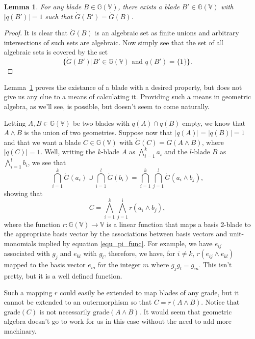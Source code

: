 \documentclass{birkjour}
\newtheorem{lem}[thm]{Lemma}
\theoremstyle{definition}
\theoremstyle{remark}
\numberwithin{equation}{section}
\newcommand{\G}{\mathbb{G}}
\newcommand{\V}{\mathbb{V}}
\newcommand{\Gi}{\dot{G}}
\begin{document}
\begin{lem}\label{lma_geo_reduction}
For any blade $B\in\G(\V)$, there exists a blade $B'\in\G(\V)$ with $|q(B')|=1$ such
that $\Gi(B')=\Gi(B)$.
\end{lem}
\begin{proof}
It is clear that $\Gi(B)$ is an algebraic set as finite unions and arbitrary
intersections of such sets are algebraic.  Now simply see that the set of all
algebraic sets is covered by the set
\begin{equation}
\{\Gi(B')|\mbox{$B'\in\G(\V)$ and $q(B')=\{1\}$}\}.
\end{equation}
\end{proof}
Lemma~\ref{lma_geo_reduction} proves the existance of a blade with a desired
property, but does not give us
any clue to a means of calculating it.  Providing such a means in geometric algebra,
as we'll see, is possible, but doesn't seem to come naturally.

Letting $A,B\in\G(\V)$ be two blades with $q(A)\cap q(B)$ empty,
we know that $A\wedge B$ is the union of two geometries.  Suppose
now that $|q(A)|=|q(B)|=1$ and that we want a blade $C\in\G(\V)$
with $\Gi(C)=\Gi(A\wedge B)$, where $|q(C)|=1$.
Well, writing the $k$-blade $A$ as $\bigwedge_{i=1}^k a_i$
and the $l$-blade $B$ as $\bigwedge_{i=1}^l b_i$, we see that
\begin{equation}
\bigcap_{i=1}^k\Gi(a_i)\cup\bigcap_{i=1}^l\Gi(b_i) = \bigcap_{i=1}^k\bigcap_{j=1}^l \Gi(a_i\wedge b_j),
\end{equation}
showing that
\begin{equation}
C=\bigwedge_{i=1}^k\bigwedge_{j=1}^l r(a_i\wedge b_j),
\end{equation}
where the function $r:\G(\V)\to\V$ is a linear function that maps
a basis 2-blade to the appropriate basis vector by the associations between
basis vectors and unit-monomials implied by equation \eqref{equ_pi_func}.
For example, we have $e_{ij}$ associated with $g_j$ and $e_{kl}$ with $g_l$,
therefore, we have, for $i\neq k$, $r(e_{ij}\wedge e_{kl})$ mapped to the basis vector $e_m$ for
the integer $m$ where $g_jg_l=g_m$.  This isn't pretty, but it is a well defined
function.

Such a mapping $r$ could easily be extended to map blades of any grade,
but it cannot be extended to an outermorphism so that $C=r(A\wedge B)$.
Notice that $\mbox{grade}(C)$ is not necessarily $\mbox{grade}(A\wedge B)$.
It would seem that geometric algebra doesn't go to work for us in this case without the need
to add more machinary.
\end{document}
